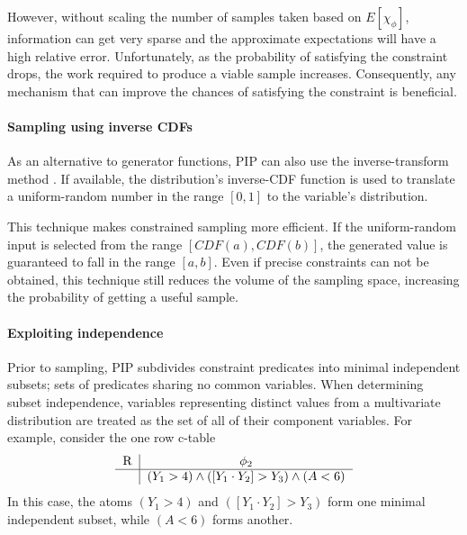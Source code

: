 However, without scaling the number of samples taken based on $E[\chi_\phi]$, information can get very sparse and the approximate expectations will have a high relative error.  Unfortunately, as the probability of satisfying the constraint drops, the work required to produce a viable sample increases.   Consequently, any mechanism that can improve the chances of satisfying the constraint is beneficial.

\paragraph{Sampling using inverse CDFs}
\label{subsec:icdf}
As an alternative to generator functions, PIP can also use the inverse-transform method \cite{lawSimulation}.  If available, the distribution's inverse-CDF function is used to translate a uniform-random number in the range $[0,1]$ to the variable's distribution.  

This technique makes constrained sampling more efficient.  If the uniform-random input is selected from the range $[CDF(a), CDF(b)]$, the generated value is guaranteed to fall in the range $[a, b]$.  Even if precise constraints can not be obtained, this technique still reduces the volume of the sampling space, increasing the probability of getting a useful sample.



\paragraph{Exploiting independence}
\label{subsec:independence}
Prior to sampling, PIP subdivides constraint predicates into minimal independent subsets; sets of predicates sharing no common variables.  When determining subset independence, variables representing distinct values from a multivariate distribution are treated as the set of all of their component variables.  For example, consider the one row c-table 
\[
\begin{tabular}{c|c}
R & $\phi_2$ \\
\hline
& $(Y_1 > 4) \wedge ([Y_1\cdot Y_2] > Y_3) \wedge (A < 6)$ \\
\end{tabular}
\]
In this case, the atoms $(Y_1 > 4)$ and $([Y_1\cdot Y_2] > Y_3)$ form one minimal independent subset, while $(A < 6)$ forms another.

